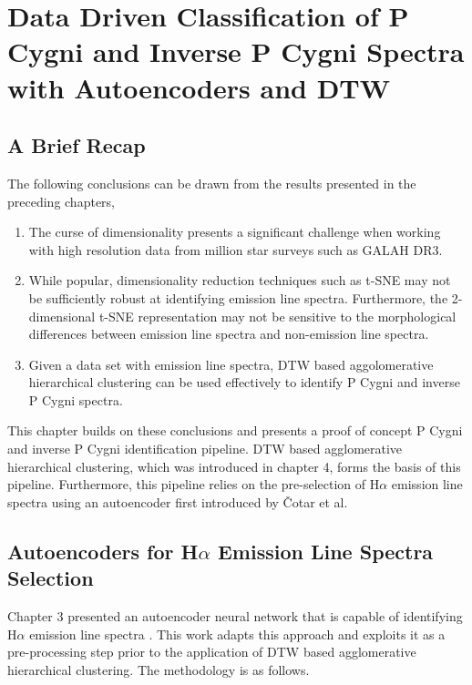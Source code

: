\chapter{Data Driven Classification of P Cygni and
Inverse P Cygni Spectra with Autoencoders and DTW}

\section{A Brief Recap}

The following conclusions can be drawn from the results presented in the preceding chapters,

\begin{enumerate}
    \item The curse of dimensionality presents a significant challenge when working with high resolution data from million star surveys such as GALAH DR3. 
    \item While popular,  dimensionality reduction techniques such as t-SNE may not be sufficiently robust at identifying emission line spectra. Furthermore, the 2-dimensional t-SNE representation may not be sensitive to the morphological differences between emission line spectra and non-emission line spectra.
    \item Given a data set with emission line spectra, DTW based aggolomerative hierarchical clustering can be used effectively to identify P Cygni and inverse P Cygni spectra.
\end{enumerate}

This chapter builds on these conclusions and presents a proof of concept P Cygni and inverse P Cygni identification pipeline. DTW based agglomerative hierarchical clustering, which  was introduced in chapter 4, forms the basis of this pipeline. Furthermore, this pipeline relies on the pre-selection of H$\alpha$ emission line spectra using an autoencoder first introduced by Čotar et al.

\section{Autoencoders for H$\alpha$ Emission Line Spectra Selection}

Chapter 3 presented an autoencoder neural network that is capable of identifying H$\alpha$ emission line spectra \cite{vcotar2021galah}. This work adapts this approach and exploits it as a pre-processing step prior to the application of DTW based agglomerative hierarchical clustering. The methodology is as follows.

